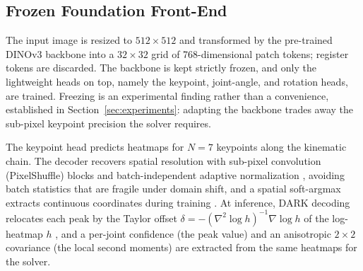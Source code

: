 \subsection{Frozen Foundation Front-End}
\label{sec:frozen}

The input image is resized to $512\times512$ and transformed by the pre-trained DINOv3 backbone into a $32\times32$ grid of 768-dimensional patch tokens; register tokens are discarded. The backbone is kept strictly frozen, and only the lightweight heads on top, namely the keypoint, joint-angle, and rotation heads, are trained. Freezing is an experimental finding rather than a convenience, established in Section~\ref{sec:experiments}: adapting the backbone trades away the sub-pixel keypoint precision the solver requires.

The keypoint head predicts heatmaps for $N=7$ keypoints along the kinematic chain. The decoder recovers spatial resolution with sub-pixel convolution (PixelShuffle) blocks \cite{shi2016real} and batch-independent adaptive normalization \cite{wu2018group,xu2019understanding}, avoiding batch statistics that are fragile under domain shift, and a spatial soft-argmax extracts continuous coordinates during training \cite{finn2016deep,sun2018integral}. At inference, DARK decoding relocates each peak by the Taylor offset $\delta = -(\nabla^{2}\log h)^{-1}\nabla\log h$ of the log-heatmap $h$ \cite{zhang2020distribution}, and a per-joint confidence (the peak value) and an anisotropic $2\times2$ covariance (the local second moments) are extracted from the same heatmaps for the solver.

